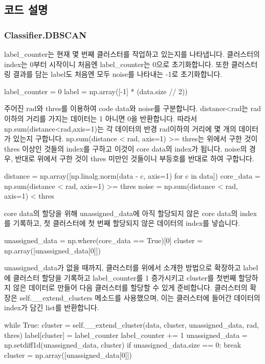 \documentclass{oblivoir}
\begin{document}
  \subsection{코드 설명}
  \subsubsection{Classifier.DBSCAN}
  label\_counter는 현재 몇 번째 클러스터를 작업하고 있는지를 나타냅니다.
  클러스터의 index는 0부터 시작이니 처음엔 label\_counter는 0으로 초기화합니다.
  또한 클러스터링 결과를 담는 label도 처음엔 모두 noise를 나타내는 -1로 초기화합니다.
  \begin{python}[label={GPS_clustering_5}]
    label_counter = 0
    label = np.array([-1] * (data.size // 2))
  \end{python}
  주어진 rad와 thres를 이용하여 code data와 noise를 구분합니다.
  distance<rad는 rad이하의 거리를 가지는 데이터는 1 아니면 0을 반환합니다.
  따라서 np.sum(distance<rad,axis=1)는 각 데이터의 반경 rad이하의 거리에 몇 개의 데이터가 있는지 구합니다.
  np.sum(distance < rad, axis=1) >= thres는 위에서 구한 것이 thres 이상인 것들의 index를 구하고 이것이 core data의 index가 됩니다.
  noise의 경우, 반대로 위에서 구한 것이 thres 미만인 것들이니 부등호를 반대로 하여 구합니다.
  \begin{python}[label={GPS_clustering_6}]
    distance = np.array([np.linalg.norm(data - c, axis=1) for c in data])
    core_data = np.sum(distance < rad, axis=1) >= thres
    noise = np.sum(distance < rad, axis=1) < thres
  \end{python}
  core data의 할당을 위해 unassigned\_data에 아직 할당되지 않은 core data의 index를 기록하고,
  첫 클러스터에 첫 번째 할당되지 않은 데이터의 index를 넣습니다.
  \begin{python}[label={GPS_clustering_7}]
    unassigned_data = np.where(core_data == True)[0]
    cluster = np.array([unassigned_data[0]])
  \end{python}
  unassigned\_data가 없을 때까지, 클러스터를 위에서 소개한 방법으로 확장하고 label에 클러스터 할당을 기록하고 label\_counter를 1 증가시키고 cluster를 첫번째 할당하지 않은 데이터로 만들어 다음 클러스터를 할당할 수 있게 준비합니다.
  클러스터의 확장은 self.\_\_extend\_clusters 메소드를 사용했으며, 이는 클러스터에 들어간 데이터의 index가 담긴 list를 반환합니다.
  \begin{python}[label={GPS_clustering_8}]
    while True:
      cluster = self.__extend_cluster(data, cluster, unassigned_data, rad, thres)
      label[cluster] = label_counter
      label_counter += 1
      unassigned_data = np.setdiff1d(unassigned_data, cluster)
      if unassigned_data.size == 0:
        break
      cluster = np.array([unassigned_data[0]])
  \end{python}
\end{document}
